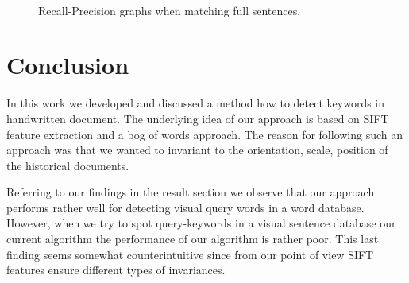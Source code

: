 \documentclass[conference]{IEEEtran}
\begin{document}
\begin{figure}[ht!]%
\centering
{}
\\
\caption{Recall-Precision graphs when matching full sentences.}
\label{fig:Results_sentences}
\end{figure}

\section{Conclusion}
In this work we developed and discussed a method how to detect keywords in handwritten document. The underlying idea of our approach is based on SIFT feature extraction and a bog of words approach. The reason for following such an approach was that we wanted to invariant to the orientation, scale, position of the historical documents. 

Referring to our findings in the result section we observe that our approach performs rather well for detecting visual query words in a word database. However, when we try to spot query-keywords in a visual sentence database our current algorithm the performance of our algorithm is rather poor. This last finding seems somewhat counterintuitive since from our point of view SIFT features ensure different types of invariances. 
\end{document}
